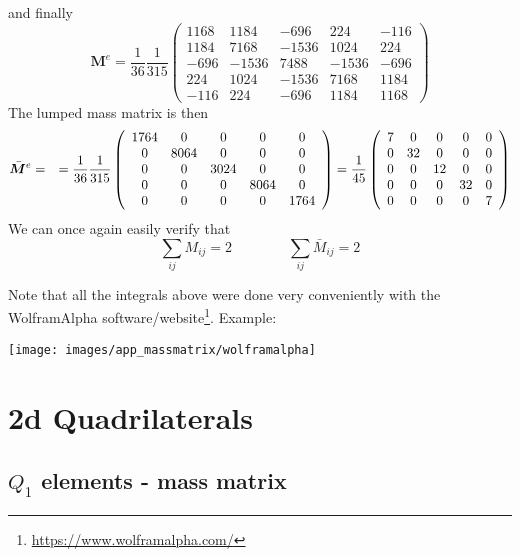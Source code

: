 and finally
\begin{equation}
\boxed{
{\bm M}^e
=\frac{1}{36}
\frac{1}{315}
\left(
\begin{array}{ccccc}
1168 & 1184 & -696 & 224 & -116 \\
1184 & 7168   & -1536  &  1024 &  224 \\
-696 & -1536 & 7488  & -1536  & -696  \\
224   & 1024 & -1536 & 7168 & 1184 \\
-116 & 224   & -696 & 1184 & 1168
\end{array}
\right)}
\end{equation}
The lumped mass matrix is then
\begin{eqnarray}
\bar{\bm M}^e 
&=&
=\frac{1}{36}
\frac{1}{315}
\left(
\begin{array}{ccccc}
1764 &0&0&0&0\\
0&8064 &0&0&0\\
0&0&3024 &0&0\\
0&0&0&8064 &0\\
0&0&0&0&1764 
\end{array}
\right)
=
\frac{1}{45}
\left(
\begin{array}{ccccc}
7 &0&0&0&0 \\
0&32 &0&0&0 \\
0&0&12  &0&0 \\
0&0&0&32   &0 \\
0&0&0&0&7      \\
\end{array}
\right) \nonumber
\end{eqnarray}
We can once again easily verify that
\[
\sum_{ij} M_{ij} = 2
\qquad
\qquad
\sum_{ij} \bar{M}_{ij} = 2
\]


Note that all the integrals above were done very conveniently 
with the WolframAlpha software/website\footnote{\url{https://www.wolframalpha.com/}}.
Example:

\begin{center}
\texttt{[image: images/app\_massmatrix/wolframalpha]}
\end{center}


\section{2d Quadrilaterals} \label{app:qrle}

\subsection{$Q_1$ elements - mass matrix}


